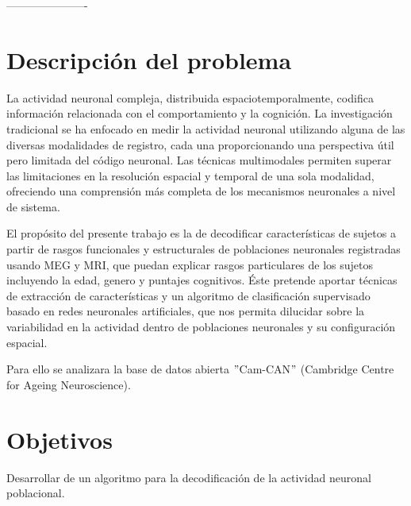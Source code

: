 \documentclass[11pt,letterpaper]{article}
\numberwithin{equation}{subsection}
\numberwithin{table}{subsection}
\begin{document}

\bigskip
----------------------
\section{Descripción del problema}

\smallskip
\noindent La actividad neuronal compleja, distribuida espaciotemporalmente, codifica información relacionada con el comportamiento y la cognición. La investigación tradicional se ha enfocado en medir la actividad neuronal utilizando alguna de las diversas modalidades de registro, cada una proporcionando una perspectiva útil pero limitada del código neuronal. Las técnicas multimodales permiten superar las limitaciones en la resolución espacial y temporal de una sola modalidad, ofreciendo una comprensión más completa de los mecanismos neuronales a nivel de sistema.

\bigskip
\noindent El propósito del presente trabajo es la de decodificar características de sujetos a partir de rasgos funcionales y estructurales de poblaciones neuronales registradas usando MEG y MRI, que puedan explicar rasgos particulares de los sujetos incluyendo la edad, genero y puntajes cognitivos. Éste pretende aportar técnicas de extracción de características y un algoritmo de clasificación supervisado basado en redes neuronales artificiales, que nos permita dilucidar sobre la variabilidad en la actividad dentro de poblaciones neuronales y su configuración espacial.


\bigskip
\noindent Para ello se analizara la base de datos abierta $"$Cam-CAN$"$ (Cambridge Centre for Ageing Neuroscience).




\section{Objetivos }

\noindent Desarrollar de un algoritmo para la decodificación de la actividad neuronal poblacional.
\end{document}
